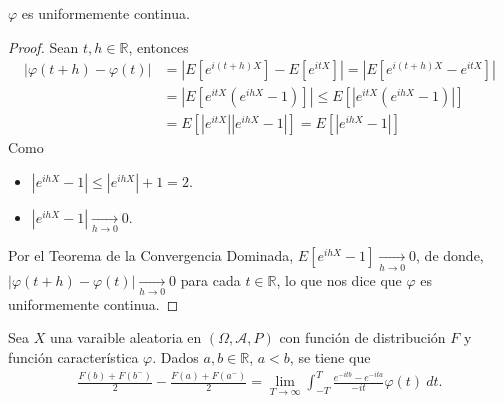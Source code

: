 \begin{teo}
    $\varphi$ es uniformemente continua.
\end{teo}

\begin{proof}
    Sean $t,h \in \mathbb{R}$, entonces
    \begin{align*}
        |\varphi(t+h) - \varphi(t)| & = \left| E\left[ e^{i(t+h)X} \right] - E\left[ e^{itX} \right] \right| = \left|E\left[ e^{i(t+h)X} - e^{itX} \right] \right|          \\
                                    & = \left|E\left[ e^{itX}\left( e^{ihX} - 1 \right) \right] \right| \leq E\left[ \left|e^{itX}\left( e^{ihX} - 1 \right) \right|\right] \\
                                    & = E\left[ \left|e^{itX}\right|\left| e^{ihX} - 1 \right| \right] = E\left[\left| e^{ihX} - 1 \right| \right]
    \end{align*}
    Como
    \begin{itemize}
        \item $\left| e^{ihX} - 1\right| \leq \left| e^{ihX} \right| + 1 = 2$.
        \item $\left| e^{ihX} - 1 \right| \xrightarrow[h \to 0]{} 0$.
    \end{itemize}
    Por el Teorema de la Convergencia Dominada, $E\left[ e^{ihX} - 1\right] \xrightarrow[h \to 0]{} 0$, de donde, $|\varphi(t+h) - \varphi(t)| \xrightarrow[h \to 0]{} 0 $ para cada $t \in \mathbb{R}$, lo que nos dice que $\varphi$ es uniformemente continua.
\end{proof}

\begin{teo}[de inversión]
    Sea $X$ una varaible aleatoria en $(\Omega, \mathcal{A}, P)$ con función de distribución $F$ y función característica $\varphi$. Dados $a,b \in \mathbb{R}$, $a < b$, se tiene que
    \begin{align*}
        \frac{F(b) + F(b^-)}{2} - \frac{F(a) + F(a^-)}{2} = \lim_{T \to \infty} \int_{-T}^{T} \frac{e^{-itb} - e^{-ita}}{-it} \varphi(t) \ dt.
    \end{align*}
\end{teo}

